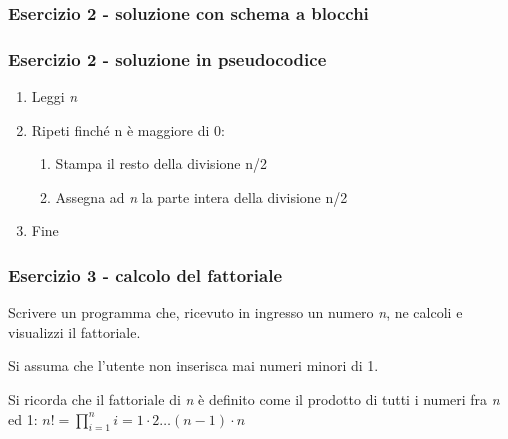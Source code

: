 \documentclass[handout]{beamer}
\begin{document}
\begin{frame}
\frametitle{Esercizio 2 - soluzione con schema a blocchi}
\centering
{}
\end{frame}

\begin{frame}
\frametitle{Esercizio 2 - soluzione in pseudocodice}
\begin{enumerate}
	\item Leggi \emph{n}
	\item Ripeti finché n è maggiore di 0:
	\begin{enumerate}
		\item Stampa il resto della divisione n/2
		\item Assegna ad \emph{n} la parte intera della divisione n/2
	\end{enumerate}
	\item Fine
\end{enumerate}
\end{frame}

\begin{frame}
\frametitle{Esercizio 3 - calcolo del fattoriale}
Scrivere un programma che, ricevuto in ingresso un numero \emph{n}, ne calcoli e visualizzi il fattoriale.

Si assuma che l'utente non inserisca mai numeri minori di 1.

Si ricorda che il fattoriale di \emph{n} è definito come il prodotto di tutti i numeri fra \emph{n} ed 1: $n! = \prod_{i=1}^{n}i = 1 \cdot 2 \dots (n-1) \cdot n$
\end{frame}
\end{document}
